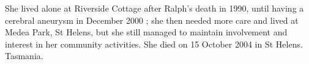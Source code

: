 She lived alone at Riverside Cottage after Ralph's death in 1990, until having a cerebral aneurysm in December 2000 ; she then needed more care and lived at Medea Park, St Helens, but she still managed to maintain involvement and interest in her community activities.  She  died on 15 October 2004 in St Helens. Tasmania.
